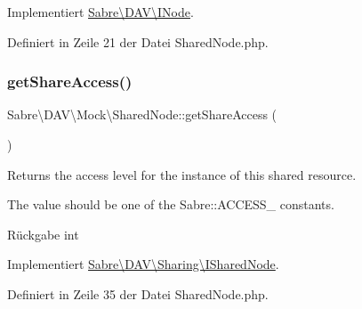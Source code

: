 Implementiert \mbox{\hyperlink{interface_sabre_1_1_d_a_v_1_1_i_node_ab616fe836b1ae36af12126a2bc934dce}{Sabre\textbackslash{}\+D\+A\+V\textbackslash{}\+I\+Node}}.



Definiert in Zeile 21 der Datei Shared\+Node.\+php.

\mbox{\label{class_sabre_1_1_d_a_v_1_1_mock_1_1_shared_node_a1b17b0c416f56f137a232a60ed8db525}} 
\subsubsection{\texorpdfstring{get\+Share\+Access()}{getShareAccess()}}
{\footnotesize\ttfamily Sabre\textbackslash{}\+D\+A\+V\textbackslash{}\+Mock\textbackslash{}\+Shared\+Node\+::get\+Share\+Access (\begin{DoxyParamCaption}{ }\end{DoxyParamCaption})}

Returns the \textquotesingle{}access level\textquotesingle{} for the instance of this shared resource.

The value should be one of the Sabre\+::\+A\+C\+C\+E\+S\+S\+\_\+ constants.

\begin{DoxyReturn}{Rückgabe}
int 
\end{DoxyReturn}


Implementiert \mbox{\hyperlink{interface_sabre_1_1_d_a_v_1_1_sharing_1_1_i_shared_node_a1c9b44f6acd1cd63b211bdf987b9d098}{Sabre\textbackslash{}\+D\+A\+V\textbackslash{}\+Sharing\textbackslash{}\+I\+Shared\+Node}}.



Definiert in Zeile 35 der Datei Shared\+Node.\+php.

\mbox{\label{class_sabre_1_1_d_a_v_1_1_mock_1_1_shared_node_a428e362da7ce65a09585099b1b61065f}} 
